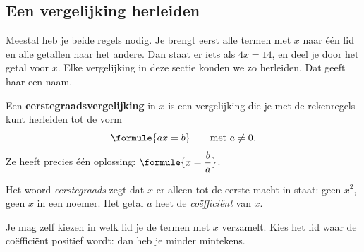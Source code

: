 
\begin{oefeningen}
\end{oefeningen}

\subsection{Een vergelijking herleiden}

Meestal heb je beide regels nodig. Je brengt eerst alle termen met $x$ naar één lid en alle getallen naar het andere. Dan staat er iets als $4x = 14$, en deel je door het getal voor $x$. Elke vergelijking in deze sectie konden we zo herleiden. Dat geeft haar een naam.

\begin{theorie}
Een \textbf{\textcolor{accent}{eerstegraadsvergelijking}} in $x$ is een vergelijking die je met de rekenregels kunt herleiden tot de vorm
\[ \formule{ax = b} \qquad \text{met } a \neq 0 . \]
Ze heeft precies één oplossing: $\formule{x = \dfrac ba}$.
\end{theorie}

Het woord \textit{eerstegraads} zegt dat $x$ er alleen tot de eerste macht in staat: geen $x^2$, geen $x$ in een noemer. Het getal $a$ heet de \textit{coëfficiënt} van $x$.


Je mag zelf kiezen in welk lid je de termen met $x$ verzamelt. Kies het lid waar de coëfficiënt positief wordt: dan heb je minder mintekens.


